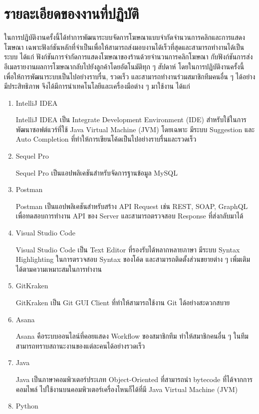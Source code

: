 \section{รายละเอียดของงานที่ปฏิบัติ}
ในการปฏิบัติงานครั้งนี้ได้ทำการพัฒนาระบบจัดการโฆษณาแบบจำกัดจำนวนการคลิกและการแสดงโฆษณา เฉพาะฟังก์ชันหลักที่จำเป็นเพื่อให้สามารถส่งมอบงานได้เร็วที่สุดและสามารถทำงานได้เป็นระบบ ได้แก่ ฟังก์ชันการจำกัดการแสดงโฆษณาของร้านด้วยจำนวนการคลิกโฆษณา กับฟังก์ชันการส่งอีเมลรายงานผลการโฆษณากลับไปยังลูกค้าโดยอัตโนมัติทุก ๆ สัปดาห์ โดยในการปฏิบัติงานครั้งนี้ เพื่อให้การพัฒนาระบบเป็นไปอย่างราบรื่น, รวดเร็ว และสามารถทำงานร่วมสมาชิกทีมคนอื่น ๆ ได้อย่างมีประสิทธิภาพ จึงได้มีการนำเทคโนโลยีและเครื่องมือต่าง ๆ มาใช้งาน ได้แก่
\begin{enumerate}
	\item IntelliJ IDEA
	
	IntelliJ IDEA เป็น Integrate Development Environment (IDE) สำหรับใช้ในการพัฒนาซอฟต์แวร์ที่ใช้ Java Virtual Machine (JVM) โดยเฉพาะ มีระบบ Suggestion และ Auto Completion ที่ทำให้การเขียนโค้ดเป็นไปอย่างราบรื่นและรวดเร็ว ~\cite{intellij}
	\item Sequel Pro
	
	Sequel Pro เป็นแอปพลิเคชันสำหรับจัดการฐานข้อมูล MySQL ~\cite{sequelpro}
	\item Postman
	
	Postman เป็นแอปพลิเคชันสำหรับสร้าง API Request เช่น REST, SOAP, GraphQL เพื่อทดสอบการทำงาน API ของ Server และสามารถตรวจสอบ Response ที่ส่งกลับมาได้ ~\cite{postman}
	\item Visual Studio Code
	
	Visual Studio Code เป็น Text Editor ที่รองรับได้หลากหลายภาษา มีระบบ Syntax Highlighting ในการตรวจสอบ Syntax ของโค้ด และสามารถติดตั้งส่วนขยายต่าง ๆ เพิ่มเติมได้ตามความเหมาะสมในการทำงาน ~\cite{vscode}
	\item GitKraken
	
	GitKraken เป็น Git GUI Client ที่ทำให้สามารถใช้งาน Git ได้อย่างสะดวกสบาย ~\cite{gitkraken}
	\item Asana
	
	Asana คือระบบออนไลน์ที่คอยแสดง Workflow ของสมาชิกทีม ทำให้สมาชิกคนอื่น ๆ ในทีมสามารถทราบสถานะงานของแต่ละคนได้อย่างรวดเร็ว ~\cite{asana}
	\item Java
	
	Java เป็นภาษาคอมพิวเตอร์ประเภท Object-Oriented ที่สามารถนำ bytecode ที่ได้จากการคอมไพล์ ไปใช้งานบนคอมพิวเตอร์เครื่องไหนก็ได้ที่มี Java Virtual Machine (JVM) ~\cite{java}
	\item Python
	

\end{enumerate}
